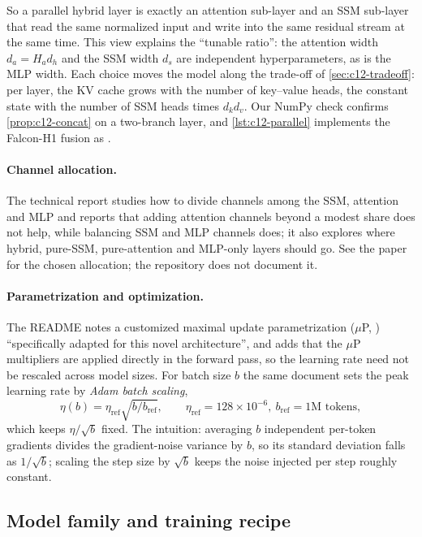 So a parallel hybrid layer is exactly an attention sub-layer and an SSM sub-layer that read the
same normalized input and write into the same residual stream at the same time. This view
explains the ``tunable ratio'': the attention width $d_a = H_ad_h$ and the SSM width $d_s$ are
independent hyperparameters, as is the MLP width. Each choice moves the model along the
trade-off of \cref{sec:c12-tradeoff}: per layer, the KV cache grows with the number of
key--value heads, the constant state with the number of SSM heads times $d_k d_v$. Our NumPy check
confirms \cref{prop:c12-concat} on a two-branch layer, and \cref{lst:c12-parallel} implements the
Falcon-H1 fusion as .

\paragraph{Channel allocation.} The technical report studies how to divide channels among the
SSM, attention and MLP and reports that adding attention channels beyond a modest share does not
help, while balancing SSM and MLP channels does; it also explores where hybrid, pure-SSM,
pure-attention and MLP-only layers should go. See the paper for the chosen allocation; the
repository does not document it.

\paragraph{Parametrization and optimization.} The README notes a customized maximal update
parametrization ($\mu$P, \citealp{c12-yang2022mup}) ``specifically adapted for this novel
architecture'', and  adds that
the $\mu$P multipliers are applied directly in the forward pass, so the learning rate need not be
rescaled across model sizes. For batch size $b$ the same document sets the peak learning rate by
\emph{Adam batch scaling},
\begin{equation}\label{eq:c12-adam-batch}
  \eta(b) = \eta_{\mathrm{ref}}\sqrt{b/b_{\mathrm{ref}}},\qquad \eta_{\mathrm{ref}} =
  128\times10^{-6},\ b_{\mathrm{ref}} = 1\text{M tokens},
\end{equation}
which keeps $\eta/\sqrt b$ fixed. The intuition: averaging $b$ independent per-token gradients
divides the gradient-noise variance by $b$, so its standard deviation falls as $1/\sqrt b$; scaling
the step size by $\sqrt b$ keeps the noise injected per step roughly constant.

\subsection{Model family and training recipe}


